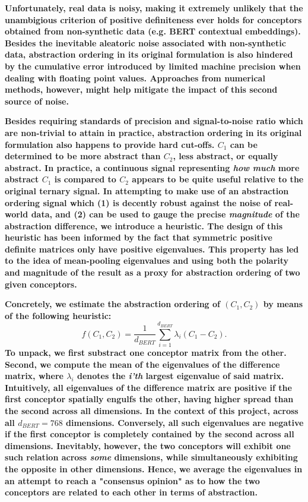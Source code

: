 \textbf{Unfortunately, real data is noisy, making it extremely unlikely that the unambigious criterion of positive definiteness ever holds for conceptors obtained from non-synthetic data (e.g. BERT contextual embeddings). Besides the inevitable aleatoric noise associated with non-synthetic data, abstraction ordering in its original formulation is also hindered by the cumulative error introduced by limited machine precision when dealing with floating point values. Approaches from numerical methods, however, might help mitigate the impact of this second source of noise.}

\textbf{Besides requiring standards of precision and signal-to-noise ratio which are non-trivial to attain in practice, abstraction ordering in its original formulation also happens to provide hard cut-offs. $C_1$ can be determined to be more abstract than $C_2$, less abstract, or equally abstract. In practice, a continuous signal representing \textit{how much} more abstract $C_1$ is compared to $C_2$ appears to be quite useful relative to the original ternary signal. In attempting to make use of an abstraction ordering signal which (1) is decently robust against the noise of real-world data, and (2) can be used to gauge the precise \textit{magnitude} of the abstraction difference, we introduce a heuristic. The design of this heuristic has been informed by the fact that symmetric positive definite matrices only have positive eigenvalues. This property has led to the idea of mean-pooling eigenvalues and using both the polarity and magnitude of the result as a proxy for abstraction ordering of two given conceptors.}

\textbf{Concretely, we estimate the abstraction ordering of $(C_1, C_2)$ by means of the following heuristic:$$f(C_1, C_2) = \frac{1}{d_{BERT}} \sum\limits_{i=1}^{d_{BERT}} \lambda_i(C_1 - C_2).$$ To unpack, we first substract one conceptor matrix from the other. Second, we compute the mean of the eigenvalues of the difference matrix, where $\lambda_i$ denotes the \textit{i'th} largest eigenvalue of said matrix. Intuitively, all eigenvalues of the difference matrix are positive if the first conceptor spatially engulfs the other, having higher spread than the second across all dimensions. In the context of this project, across all $d_{BERT} = 768$ dimensions. Conversely, all such eigenvalues are negative if the first conceptor is completely contained by the second across all dimensions. Inevitably, however, the two conceptors will exhibit one such relation across \textit{some} dimensions, while simultaneously exhibiting the opposite in other dimensions. Hence, we average the eigenvalues in an attempt to reach a "consensus opinion" as to how the two conceptors are related to each other in terms of abstraction.}

